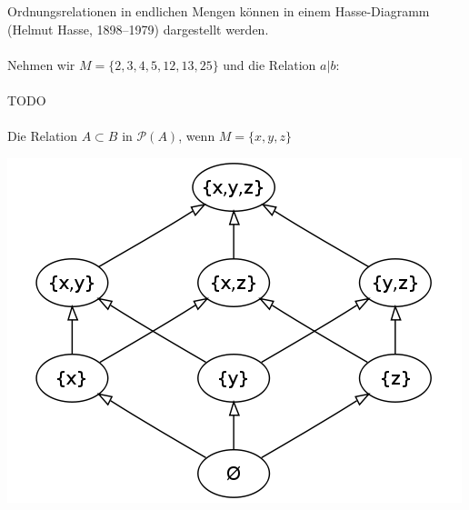 \documentclass{report}
\begin{document}
Ordnungsrelationen in endlichen Mengen können in einem Hasse-Diagramm (Helmut Hasse, 1898–1979) dargestellt werden.\\\\
Nehmen wir $M = \{2,3,4,5,12,13,25\}$ und die Relation $a | b$:
\\\\TODO\\\\
Die Relation $A \subset B$ in $\mathcal{P}(A)$, wenn $M = \{x,y,z\}$
\begin{center}\includegraphics[scale=0.3]{img/Hasse_diagram_of_powerset_of_3.png}\end{center}
\end{document}
